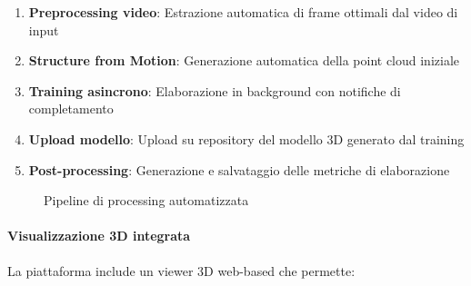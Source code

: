 \begin{enumerate}
\item \textbf{Preprocessing video}: Estrazione automatica di frame ottimali dal video di input
\item \textbf{Structure from Motion}: Generazione automatica della point cloud iniziale
\item \textbf{Training asincrono}: Elaborazione in background con notifiche di completamento
\item \textbf{Upload modello}: Upload su repository del modello 3D generato dal training
\item \textbf{Post-processing}: Generazione e salvataggio delle metriche di elaborazione
\end{enumerate}

\begin{figure}[htbp]
	\centering
	\caption{Pipeline di processing automatizzata}
	\label{fig:functional_workflow}
\end{figure}

\paragraph{Visualizzazione 3D integrata}
La piattaforma include un viewer 3D web-based che permette:

